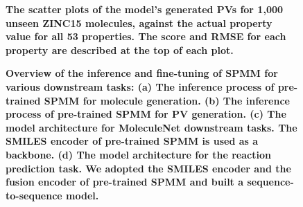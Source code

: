 \documentclass{nature_meth}
\newcommand{\1}{\blmath{1}}
\newcommand{\0}{\blmath{0}}
\begin{document}
\begin{figure}[!h]
	\centering
 \centerline{}
	\caption{\bf\footnotesize 
The scatter plots of the model's generated PVs for 1,000 unseen ZINC15 molecules, against the actual property value for all 53 properties. The  score and RMSE for each property are described at the top of each plot.
}
	\label{supp1}
\end{figure}

\begin{figure}[!h]
	\centering
 \centerline{}
	\caption{\bf\footnotesize 
Overview of the inference and fine-tuning of SPMM for various downstream tasks: (a) The inference process of pre-trained SPMM for molecule generation. (b) The inference process of pre-trained SPMM for PV generation. (c) The model architecture for MoleculeNet downstream tasks. The SMILES encoder of pre-trained SPMM is used as a backbone. (d) The model architecture for the reaction prediction task. We adopted the SMILES encoder and the fusion encoder of pre-trained SPMM and built a sequence-to-sequence model.
}
	\label{suppl2}
\end{figure}
\end{document}
